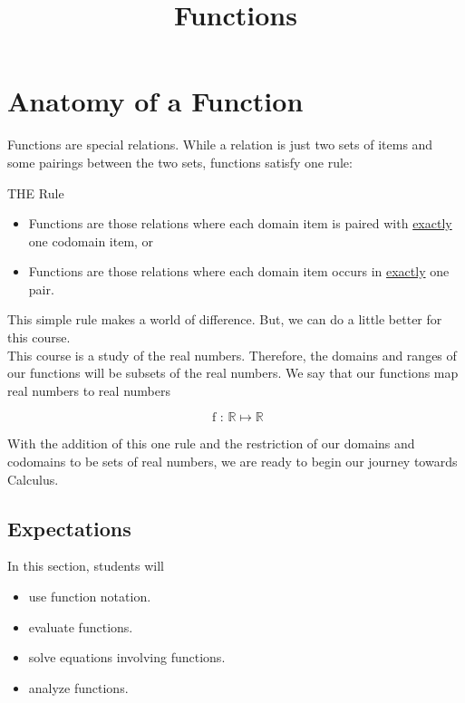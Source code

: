 \documentclass{ximera}
\title{Functions}
\begin{document}
\begin{abstract}
\end{abstract}
\maketitle





\section{Anatomy of a Function}


Functions are special relations. While a relation is just two sets of items and some pairings between the two sets, functions satisfy one rule: \\


\begin{condition} THE Rule

\begin{itemize}
\item Functions are those relations where each domain item is paired with \underline{exactly} one codomain item, or
\item Functions are those relations where each domain item occurs in \underline{exactly} one pair.
\end{itemize}
\end{condition}

This simple rule makes a world of difference. But, we can do a little better for this course. \\




This course is a study of the real numbers.  Therefore, the domains and ranges of our functions will be subsets of the real numbers.  We say that our functions map real numbers to real numbers

\[
\text{ f : } \mathbb{R} \mapsto \mathbb{R}
\]


With the addition of this one rule and the restriction of our domains and codomains to be sets of real numbers, we are ready to begin our journey towards Calculus.








\subsection{Expectations}


\begin{sectionOutcomes}
In this section, students will 

\begin{itemize}
\item use function notation.
\item evaluate functions.
\item solve equations involving functions.
\item analyze functions.
\end{itemize}
\end{sectionOutcomes}
\end{document}
